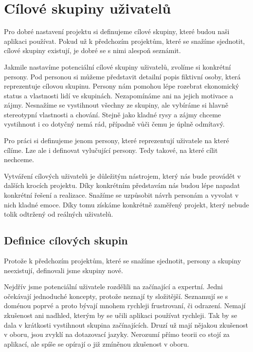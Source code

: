 
\chapter{Cílové skupiny uživatelů}

Pro dobré nastavení projektu si definujeme cílové skupiny, které budou naši aplikaci používat. Pokud už k předchozím projektům, které se snažíme sjednotit, cílové skupiny existují, je dobré se s nimi alespoň seznámit.

Jakmile nastavíme potenciální cílové skupiny uživatelů, zvolíme si konkrétní persony. Pod personou si můžeme představit detailní popis fiktivní osoby, která reprezentuje cílovou skupinu. Persony nám pomohou lépe rozebrat ekonomický status a vlastnosti lidí ve skupinách. Nezapomínáme ani na jejich motivace a zájmy. Nesnažíme se vystihnout všechny ze skupiny, ale vybíráme si hlavně stereotypní vlastnosti a chování. Stejně jako kladné rysy a zájmy chceme vystihnout i co dotyčný nemá rád, případně vůči čemu je úplně odmítavý. 

Pro práci si definujeme jenom persony, které reprezentují uživatele na které cílíme. Lze ale i definovat vylučující persony. Tedy takové, na které cílit nechceme.

Vytváření cílových uživatelů je důležitým nástrojem, který nás bude provádět v dalších krocích projektu. Díky konkrétním představám nás budou lépe napadat konkrétní řešení a realizace. Snažíme se uzpůsobit návrh personám a vyvolat v nich kladné emoce. Díky tomu získáme konkrétně zaměřený projekt, který nebude tolik odtržený od reálných uživatelů.

\section{Definice cílových skupin}

Protože k předchozím projektům, které se snažíme sjednotit, persony a skupiny neexistují, definovali jsme skupiny nové.

Nejdřív jsme potenciální uživatele rozdělili na začínající a expertní. Jedni očekávají jednoduché koncepty, protože neznají ty složitější. Seznamují se s doménou poprvé a proto bývají mnohem rychleji frustrovaní, či odrazení. Nemají zkušenost ani nadhled, kterým by se učili aplikaci používat rychleji. Tak by se dala v krátkosti vystihnout skupina začínajících. Druzí už mají nějakou zkušenost v oboru, jsou zvyklí na dotazovací jazyky. Nerozumí přímo teorii co stojí za aplikací, ale spíše se opírají o již zmíněnou zkušenost v oboru.

